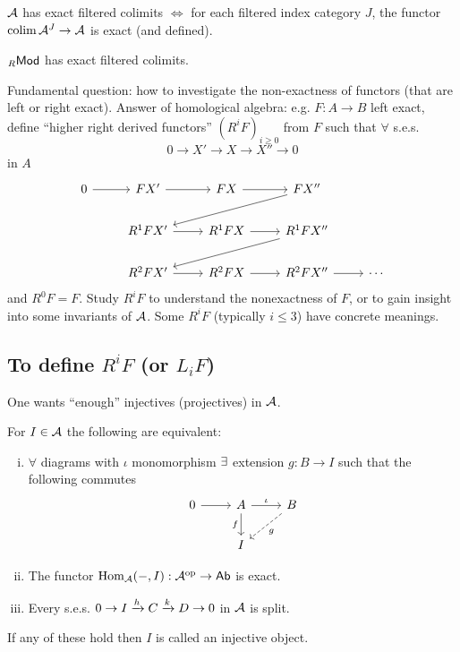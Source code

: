 \documentclass[a4paper]{report}
\begin{document}
\begin{defi}
$\mathcal{A}$ has exact filtered colimits $\iff$ for each filtered index category $J$, the functor $\operatorname*{colim} \mathcal{A}^{J} \to \mathcal{A}$ is exact (and defined).
\end{defi}

\begin{thm}
${}_R\mathsf{Mod}$ has exact filtered colimits.
\end{thm}

Fundamental question: how to investigate the non-exactness of functors (that are left or right exact).
Answer of homological algebra: e.g. $F: A \to B$ left exact, define ``higher right derived functors'' $(R^{i}F)_{i \ge 0}$ from $F$ such that $\forall$ s.e.s. \[0 \to X' \to X \to X'' \to 0\] in $A$
\[\begin{tikzcd}
0 \arrow[r] & FX' \arrow[r]    & FX \arrow[r]    & FX'' \arrow[lld]    &        \\
            & R^1FX' \arrow[r] & R^1FX \arrow[r] & R^1FX'' \arrow[lld] &        \\
            & R^2FX' \arrow[r] & R^2FX \arrow[r] & R^2FX'' \arrow[r]   & \cdots
          \end{tikzcd}\]
        and $R^{0}F = F$. Study $R^{i}F$ to understand the nonexactness of $F$, or to gain insight into some invariants of $\mathcal{A}$. Some $R^{i}F$ (typically $i \le 3$) have concrete meanings.

\subsection{To define $R^{i}F$ (or $L_{i}F$)}
One wants ``enough'' injectives (projectives) in $\mathcal{A}$.

\begin{thm-defi}For $I \in \mathcal{A}$ the following are equivalent:
  \begin{enumerate}[(i)]
\item $\forall$ diagrams with $\iota$ monomorphism $\exists$ extension $g: B \to I$ such that the following commutes\[\begin{tikzcd}
0 \arrow[r] & A \arrow[r, "\iota"] \arrow[d, "f"'] & B \arrow[ld, "g", dashed] \\
            & I                                &
          \end{tikzcd}\]
    \item The functor $\operatorname{Hom}_{\mathcal{A}}(-, I) : \mathcal{A}^\mathrm{op} \to \mathsf{Ab}$ is exact.
    \item Every s.e.s. $0 \to I \xrightarrow h C \xrightarrow k D \to 0$ in $\mathcal{A}$ is split.
  \end{enumerate}
  If any of these hold then $I$ is called an injective object.
\end{thm-defi}
\end{document}
